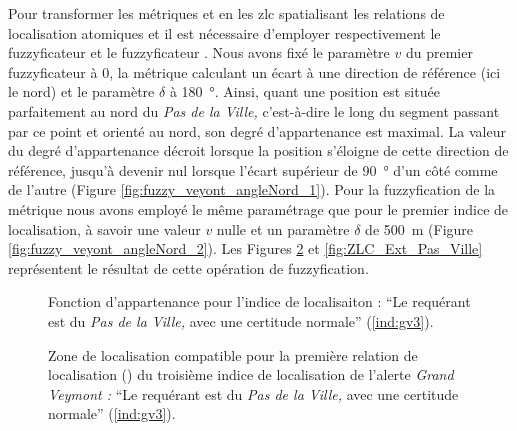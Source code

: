 Pour transformer les métriques  et
 en les \ac{zlc} spatialisant les relations de
localisation atomiques  et
 il est nécessaire
d'employer respectivement le fuzzyficateur  et
le fuzzyficateur . Nous avons fixé le
paramètre \(v\) du premier fuzzyficateur à 0, la métrique
 calculant un écart à une direction de
référence (ici le nord) et le paramètre \(\delta\) à
\SI{180}{\degree}. Ainsi, quant une position est située parfaitement
au nord du \emph{Pas de la Ville,} c'est-à-dire le long du segment
passant par ce point et orienté au nord, son degré d'appartenance est
maximal. La valeur du degré d'appartenance décroit lorsque la position
s'éloigne de cette direction de référence, jusqu'à devenir nul lorsque
l'écart supérieur de \SI{90}{\degree} d'un côté comme de l'autre
(Figure \ref{fig:fuzzy_veyont_angleNord_1}). Pour la fuzzyfication de
la métrique  nous avons employé le même
paramétrage que pour le premier indice de localisation, à savoir une
valeur \(v\) nulle et un paramètre \(\delta\) de \SI{500}{\meter}
(Figure \ref{fig:fuzzy_veyont_angleNord_2}). Les Figures
\ref{fig:ZLC_Nord_Pas_Ville} et \ref{fig:ZLC_Ext_Pas_Ville}
représentent le résultat de cette opération de fuzzyfication.

\begin{figure} \centering
\subfloat[\label{fig:fuzzy_veyont_angleNord_1}]{%
}\hspace{1cm}
  \subfloat[\label{fig:fuzzy_veyont_angleNord_2}]{%
}
\caption{Fonction d'appartenance pour l'indice de localisaiton :
  \enquote{Le requérant est \protect{}
    du \emph{Pas de la Ville,} avec une certitude normale}
  (\ref{ind:gv3}).}
  \label{fig:fuzzy_veyont_angleNord}
\end{figure}


\begin{figure}
  \centering
  
  \caption{Zone de localisation compatible pour la première relation
    de localisation (\protect{}) du troisième
    indice de localisation de l'alerte \emph{Grand Veymont :}
    \enquote{Le requérant est
      \protect{} du \emph{Pas de la
        Ville,} avec une certitude normale} (\ref{ind:gv3}).}
  \label{fig:ZLC_Nord_Pas_Ville}
\end{figure}



